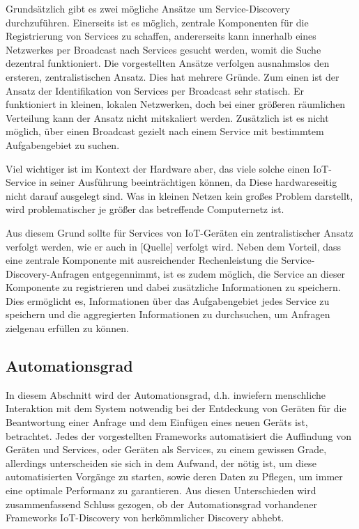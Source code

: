 \documentclass[conference,compsoc]{IEEEtran}
\begin{document}
Grundsätzlich gibt es zwei mögliche Ansätze um Service-Discovery durchzuführen. Einerseits ist es möglich, zentrale Komponenten für die Registrierung von Services zu schaffen, andererseits kann innerhalb eines Netzwerkes per Broadcast nach Services gesucht werden, womit die Suche dezentral funktioniert. Die vorgestellten Ansätze verfolgen ausnahmslos den ersteren, zentralistischen Ansatz. Dies hat mehrere Gründe. Zum einen ist der Ansatz der Identifikation von Services per Broadcast sehr statisch. Er funktioniert in kleinen, lokalen Netzwerken, doch bei einer größeren räumlichen Verteilung kann der Ansatz nicht mitskaliert werden. Zusätzlich ist es nicht möglich, über einen Broadcast gezielt nach einem Service mit bestimmtem Aufgabengebiet zu suchen.

Viel wichtiger ist im Kontext der Hardware aber, das viele solche einen IoT-Service in seiner Ausführung beeinträchtigen können, da Diese hardwareseitig nicht darauf ausgelegt sind. Was in kleinen Netzen kein großes Problem darstellt, wird problematischer je größer das betreffende Computernetz ist. 

Aus diesem Grund sollte für Services von IoT-Geräten ein zentralistischer Ansatz verfolgt werden, wie er auch in [Quelle] verfolgt wird. Neben dem Vorteil, dass eine zentrale Komponente mit ausreichender Rechenleistung die Service-Discovery-Anfragen entgegennimmt, ist es zudem möglich, die Service an dieser Komponente zu registrieren und dabei zusätzliche Informationen zu speichern. Dies ermöglicht es, Informationen über das Aufgabengebiet jedes Service zu speichern und die aggregierten Informationen zu durchsuchen, um Anfragen zielgenau erfüllen zu können. 


\subsection{Automationsgrad}

In diesem Abschnitt wird der Automationsgrad, d.h. inwiefern menschliche Interaktion mit dem System notwendig bei der Entdeckung von Geräten für die Beantwortung einer Anfrage und dem Einfügen eines neuen Geräts ist, betrachtet. Jedes der vorgestellten Frameworks automatisiert die Auffindung von Geräten und Services, oder Geräten als Services, zu einem gewissen Grade, allerdings unterscheiden sie sich in dem Aufwand, der nötig ist, um diese automatisierten Vorgänge zu starten, sowie deren Daten zu Pflegen, um immer eine optimale Performanz zu garantieren. Aus diesen Unterschieden wird zusammenfassend Schluss gezogen, ob der Automationsgrad vorhandener Frameworks IoT-Discovery von herkömmlicher Discovery abhebt.
\end{document}
